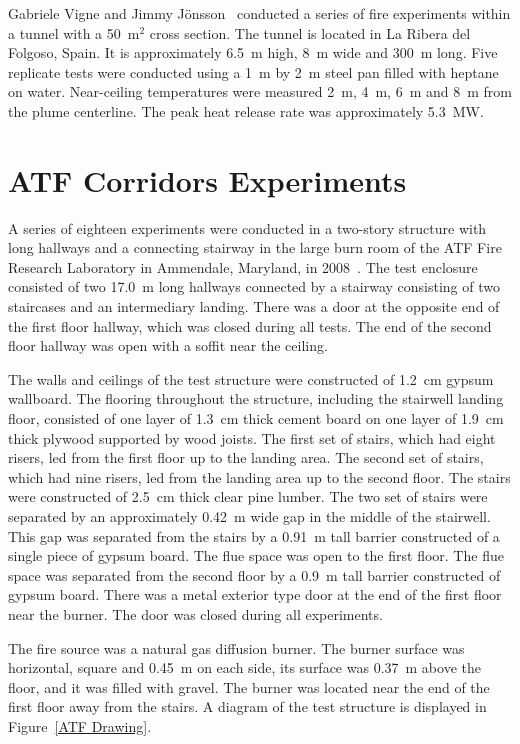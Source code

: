 Gabriele Vigne and Jimmy J\"{o}nsson~\cite{Vigne:2009} conducted a series of fire experiments within a tunnel with a 50~m$^2$ cross section. The tunnel is located in La Ribera del Folgoso, Spain. It is approximately 6.5~m high, 8~m wide and 300~m long. Five replicate tests were conducted using a 1~m by 2~m steel pan filled with heptane on water. Near-ceiling temperatures were measured 2~m, 4~m, 6~m and 8~m from the plume centerline. The peak heat release rate was approximately 5.3~MW.


\section{ATF Corridors Experiments}
\label{ATF_Corridors_Description}

A series of eighteen experiments were conducted in a two-story structure with long hallways and a connecting stairway in the large burn room of the ATF Fire Research Laboratory in Ammendale, Maryland, in 2008~\cite{Sheppard:Corridors}. The test enclosure consisted of two 17.0~m long hallways connected by a stairway consisting of two staircases and an intermediary landing. There was a door at the opposite end of the first floor hallway, which was closed during all tests. The end of the second floor hallway was open with a soffit near the ceiling.

The walls and ceilings of the test structure were constructed of 1.2~cm gypsum wallboard. The flooring throughout the structure, including the stairwell landing floor, consisted of one layer of 1.3~cm thick cement board on one layer of 1.9~cm thick plywood supported by wood joists. The first set of stairs, which had eight risers, led from the first floor up to the landing area. The second set of stairs, which had nine risers, led from the landing area up to the second floor. The stairs were constructed of 2.5~cm thick clear pine lumber. The two set of stairs were separated by an approximately 0.42~m wide gap in the middle of the stairwell. This gap was separated from the stairs by a 0.91~m tall barrier constructed of a single piece of gypsum board. The flue space was open to the first floor.  The flue space was separated from the second floor by a 0.9~m tall barrier constructed of gypsum board. There was a metal exterior type door at the end of the first floor near the burner.  The door was closed during all experiments.

The fire source was a natural gas diffusion burner.  The burner surface was horizontal, square and 0.45~m on each side, its surface was 0.37~m above the floor, and it was filled with gravel. The burner was located near the end of the first floor away from the stairs. A diagram of the test structure is displayed in Figure~\ref{ATF Drawing}.

